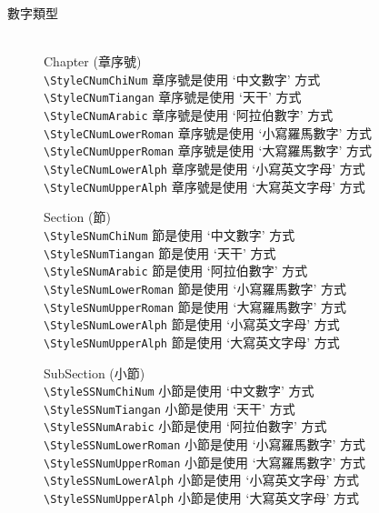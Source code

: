 \begin{enumerate}
{\begin{description}
    \item [數字類型]\hfill\\
     Chapter (章序號)\\
        \verb|\StyleCNumChiNum| 章序號是使用 `中文數字' 方式\\
        \verb|\StyleCNumTiangan| 章序號是使用 `天干' 方式\\
        \verb|\StyleCNumArabic| 章序號是使用 `阿拉伯數字' 方式\\
        \verb|\StyleCNumLowerRoman| 章序號是使用 `小寫羅馬數字' 方式\\
        \verb|\StyleCNumUpperRoman| 章序號是使用 `大寫羅馬數字' 方式\\
        \verb|\StyleCNumLowerAlph| 章序號是使用 `小寫英文字母' 方式\\
        \verb|\StyleCNumUpperAlph| 章序號是使用 `大寫英文字母' 方式

     Section (節)\\
        \verb|\StyleSNumChiNum| 節是使用 `中文數字' 方式\\
        \verb|\StyleSNumTiangan| 節是使用 `天干' 方式\\
        \verb|\StyleSNumArabic| 節是使用 `阿拉伯數字' 方式\\
        \verb|\StyleSNumLowerRoman| 節是使用 `小寫羅馬數字' 方式\\
        \verb|\StyleSNumUpperRoman| 節是使用 `大寫羅馬數字' 方式\\
        \verb|\StyleSNumLowerAlph| 節是使用 `小寫英文字母' 方式\\
        \verb|\StyleSNumUpperAlph| 節是使用 `大寫英文字母' 方式

     SubSection (小節)\\
        \verb|\StyleSSNumChiNum| 小節是使用 `中文數字' 方式\\
        \verb|\StyleSSNumTiangan| 小節是使用 `天干' 方式\\
        \verb|\StyleSSNumArabic| 小節是使用 `阿拉伯數字' 方式\\
        \verb|\StyleSSNumLowerRoman| 小節是使用 `小寫羅馬數字' 方式\\
        \verb|\StyleSSNumUpperRoman| 小節是使用 `大寫羅馬數字' 方式\\
        \verb|\StyleSSNumLowerAlph| 小節是使用 `小寫英文字母' 方式\\
        \verb|\StyleSSNumUpperAlph| 小節是使用 `大寫英文字母' 方式


\end{description}}
\end{enumerate}

